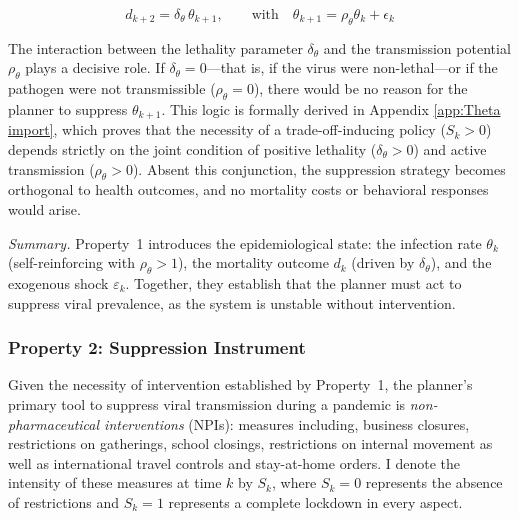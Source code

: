 \documentclass[12pt, a4paper]{article}
\newcommand{\Sk}{S_k}
\begin{document}
\begin{equation}
    d_{k+2} = \delta_\theta \, \theta_{k+1}, \qquad \text{with} \quad \theta_{k+1} = \rho_\theta \theta_k+\epsilon_k
    \label{eq:mortality_intro}
\end{equation}

The interaction between the lethality parameter $\delta_\theta$ and the transmission potential $\rho_\theta$ plays a decisive role. If $\delta_\theta = 0$---that is, if the virus were non-lethal---or if the pathogen were not transmissible ($\rho_\theta = 0$), there would be no reason for the planner to suppress $\theta_{k+1}$. This logic is formally derived in Appendix \ref{app:Theta import}, which proves that the necessity of a trade-off-inducing policy ($S_k > 0$) depends strictly on the joint condition of positive lethality ($\delta_\theta > 0$) and active transmission ($\rho_\theta > 0$). Absent this conjunction, the suppression strategy becomes orthogonal to health outcomes, and no mortality costs or behavioral responses would arise.


\medskip
\noindent\textit{Summary.} Property~1 introduces the epidemiological state: the infection rate $\theta_k$ (self-reinforcing with $\rho_\theta > 1$), the mortality outcome $d_k$ (driven by $\delta_\theta$), and the exogenous shock $\varepsilon_k$. Together, they establish that the planner must act to suppress viral prevalence, as the system is unstable without intervention.


\subsubsection*{Property 2: Suppression Instrument}
Given the necessity of intervention established by Property~1, the planner's primary tool to suppress viral transmission during a pandemic is \textit{non-pharmaceutical interventions} (NPIs): measures including, business closures, restrictions on gatherings, school closings, restrictions on internal movement as well as international travel controls and stay-at-home orders. I denote the intensity of these measures at time $k$ by $\Sk$, where $\Sk = 0$ represents the absence of restrictions and $\Sk = 1$ represents a complete lockdown in every aspect. 
\end{document}
